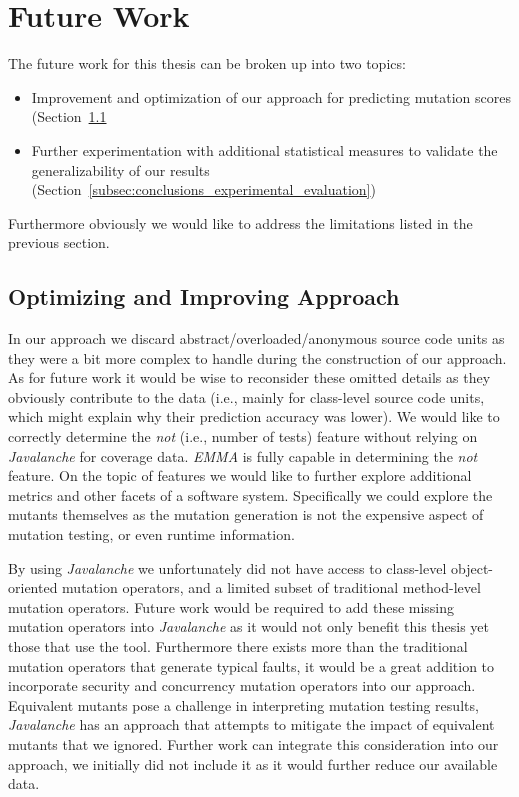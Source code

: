 \section{Future Work}
\label{sec:conclusions_future_work}
The future work for this thesis can be broken up into two topics:

\begin{itemize}
  \item Improvement and optimization of our approach for predicting mutation scores (Section~\ref{subsec:conclusions_optimizing_approach}
  \item Further experimentation with additional statistical measures to validate the generalizability of our results (Section~\ref{subsec:conclusions_experimental_evaluation})
\end{itemize}

Furthermore obviously we would like to address the limitations listed in the previous section.


\subsection{Optimizing and Improving Approach}
\label{subsec:conclusions_optimizing_approach}
In our approach we discard abstract/overloaded/anonymous source code units as they were a bit more complex to handle during the construction of our approach. As for future work it would be wise to reconsider these omitted details as they obviously contribute to the data (i.e., mainly for class-level source code units, which might explain why their prediction accuracy was lower). We would like to correctly determine the \emph{not} (i.e., number of tests) feature without relying on \emph{Javalanche} for coverage data. \emph{EMMA} is fully capable in determining the \emph{not} feature. On the topic of features we would like to further explore additional metrics and other facets of a software system. Specifically we could explore the mutants themselves as the mutation generation is not the expensive aspect of mutation testing, or even runtime information.

By using \emph{Javalanche} we unfortunately did not have access to class-level object-oriented mutation operators, and a limited subset of traditional method-level mutation operators. Future work would be required to add these missing mutation operators into \emph{Javalanche} as it would not only benefit this thesis yet those that use the tool. Furthermore there exists more than the traditional mutation operators that generate typical faults, it would be a great addition to incorporate security and concurrency mutation operators into our approach. Equivalent mutants pose a challenge in interpreting mutation testing results, \emph{Javalanche} has an approach that attempts to mitigate the impact of equivalent mutants that we ignored. Further work can integrate this consideration into our approach, we initially did not include it as it would further reduce our available data.

